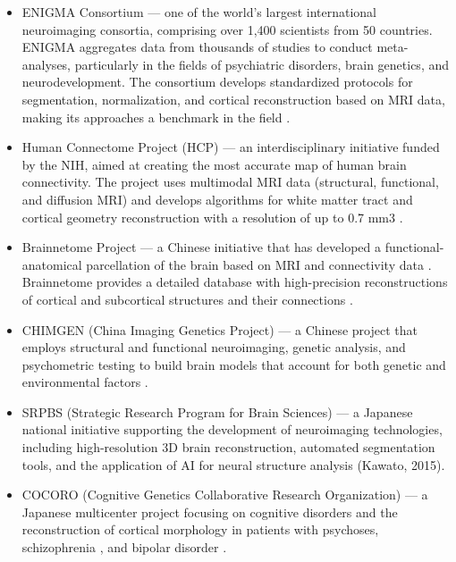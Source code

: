 \documentclass[default]{subfiles}
\begin{document}
\begin{itemize}
    \item ENIGMA Consortium — one of the world’s largest international neuroimaging consortia, comprising over 1,400
    scientists from 50 countries. ENIGMA aggregates data from thousands of studies to conduct meta-analyses,
    particularly in the fields of psychiatric disorders, brain genetics, and neurodevelopment. The consortium develops
    standardized protocols for segmentation, normalization, and cortical reconstruction based on MRI data, making its
    approaches a benchmark in the field \cite{hellard_2014}.

    \item Human Connectome Project (HCP) — an interdisciplinary initiative funded by the NIH, aimed at creating the
    most accurate map of human brain connectivity. The project uses multimodal MRI data (structural, functional, and
    diffusion MRI) and develops algorithms for white matter tract and cortical geometry reconstruction with a
    resolution of up to 0.7 mm3 \cite{van_2013}.
    
    \item Brainnetome Project — a Chinese initiative that has developed a functional-anatomical parcellation of the
    brain based on MRI and connectivity data \cite{milton_2021}. Brainnetome provides a detailed database with
    high-precision reconstructions of cortical and subcortical structures and their connections
    \cite{jiang_2013, hohnson_2016}.
    
    \item CHIMGEN (China Imaging Genetics Project) — a Chinese project that employs structural and functional
    neuroimaging, genetic analysis, and psychometric testing to build brain models that account for both genetic and
    environmental factors \cite{xu_2020}.
    
    \item SRPBS (Strategic Research Program for Brain Sciences) — a Japanese national initiative supporting the
    development of neuroimaging technologies, including high-resolution 3D brain reconstruction, automated segmentation
    tools, and the application of AI for neural structure analysis (Kawato, 2015).
    
    \item COCORO (Cognitive Genetics Collaborative Research Organization) — a Japanese multicenter project focusing on
    cognitive disorders and the reconstruction of cortical morphology in patients with psychoses, schizophrenia
    \cite{madeira_2020}, and bipolar disorder \cite{koshiyama_2022}.\newline
\end{itemize}
\end{document}
